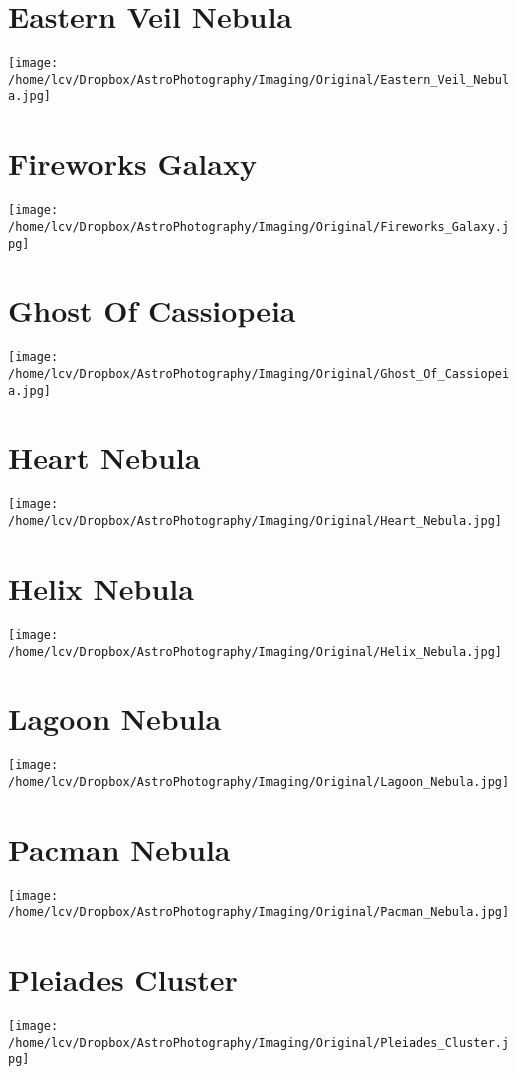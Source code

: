 \section{Eastern Veil Nebula}
\texttt{[image: /home/lcv/Dropbox/AstroPhotography/Imaging/Original/Eastern\_Veil\_Nebula.jpg]}
{\footnotesize\color{white}

}
\section{Fireworks Galaxy}
\texttt{[image: /home/lcv/Dropbox/AstroPhotography/Imaging/Original/Fireworks\_Galaxy.jpg]}
{\footnotesize\color{white}

}
\section{Ghost Of Cassiopeia}
\texttt{[image: /home/lcv/Dropbox/AstroPhotography/Imaging/Original/Ghost\_Of\_Cassiopeia.jpg]}
{\footnotesize\color{white}

}
\section{Heart Nebula}
\texttt{[image: /home/lcv/Dropbox/AstroPhotography/Imaging/Original/Heart\_Nebula.jpg]}
{\footnotesize\color{white}

}
\section{Helix Nebula}
\texttt{[image: /home/lcv/Dropbox/AstroPhotography/Imaging/Original/Helix\_Nebula.jpg]}
{\footnotesize\color{white}

}
\section{Lagoon Nebula}
\texttt{[image: /home/lcv/Dropbox/AstroPhotography/Imaging/Original/Lagoon\_Nebula.jpg]}
{\footnotesize\color{white}

}
\section{Pacman Nebula}
\texttt{[image: /home/lcv/Dropbox/AstroPhotography/Imaging/Original/Pacman\_Nebula.jpg]}
{\footnotesize\color{white}

}
\section{Pleiades Cluster}
\texttt{[image: /home/lcv/Dropbox/AstroPhotography/Imaging/Original/Pleiades\_Cluster.jpg]}
{\footnotesize\color{white}

}

